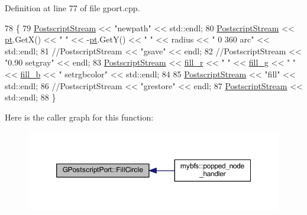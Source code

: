 Definition at line 77 of file gport.\+cpp.


\begin{DoxyCode}
78 \{
79     \mbox{\hyperlink{class_g_postscript_port_a0fb398f1c65b3ccb0efccd509f60d20d}{PostscriptStream}} << \textcolor{stringliteral}{"newpath"} << std::endl;
80     \mbox{\hyperlink{class_g_postscript_port_a0fb398f1c65b3ccb0efccd509f60d20d}{PostscriptStream}} << \mbox{\hyperlink{rings_8cpp_af69bbacaaf68a115b351c5d1e29c3cc8}{pt}}.GetX() << \textcolor{stringliteral}{" "} << -\mbox{\hyperlink{rings_8cpp_af69bbacaaf68a115b351c5d1e29c3cc8}{pt}}.GetY() << \textcolor{stringliteral}{" "} << radius << \textcolor{stringliteral}{" 0 360 arc"}
               << std::endl;
81     \textcolor{comment}{//PostscriptStream << "gsave"                                       << endl;}
82     \textcolor{comment}{//PostscriptStream << "0.90 setgray"                                        << endl;}
83     \mbox{\hyperlink{class_g_postscript_port_a0fb398f1c65b3ccb0efccd509f60d20d}{PostscriptStream}} << \mbox{\hyperlink{class_g_postscript_port_ab2a7d722f2cc8624ba2deccce41d287d}{fill\_r}} << \textcolor{stringliteral}{" "} << \mbox{\hyperlink{class_g_postscript_port_a50c6a0edf2edfb66f6a57b7cf847f2e2}{fill\_g}} << \textcolor{stringliteral}{" "} <<  
      \mbox{\hyperlink{class_g_postscript_port_a60fd8f27f76db55846837e93ccf5f582}{fill\_b}} << \textcolor{stringliteral}{" setrgbcolor"}                                      << std::endl;
84     
85     \mbox{\hyperlink{class_g_postscript_port_a0fb398f1c65b3ccb0efccd509f60d20d}{PostscriptStream}} << \textcolor{stringliteral}{"fill"}                                      << std::endl;
86     \textcolor{comment}{//PostscriptStream << "grestore"                                        << endl;}
87     \mbox{\hyperlink{class_g_postscript_port_a0fb398f1c65b3ccb0efccd509f60d20d}{PostscriptStream}} << std::endl;
88 \}
\end{DoxyCode}
Here is the caller graph for this function\+:\nopagebreak
\begin{figure}[H]
\begin{center}
\leavevmode
\includegraphics[width=350pt]{class_g_postscript_port_a802ee0f5b503ec12b1400e4b20725419_icgraph}
\end{center}
\end{figure}
\mbox{\label{class_g_base_port_aeca5105700149693465fb5dbc43c9bbc}} 
